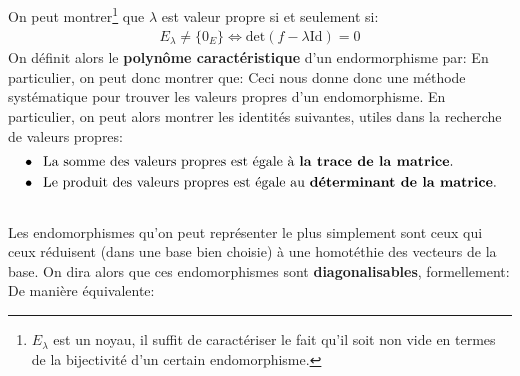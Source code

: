 \subsection*{}
On peut montrer\footnote[1]{\(E_\lambda\) est un noyau, il suffit de caractériser le fait qu'il soit non vide en termes de la bijectivité d'un certain endomorphisme.} que \(\lambda\) est valeur propre si et seulement si:
\begin{align*}
   E_\lambda \neq \bigl\{0_E\bigl\} \Longleftrightarrow \text{det}(f - \lambda \text{Id}) = 0
\end{align*}
On définit alors le \textbf{polynôme caractéristique} d'un endormorphisme par:
En particulier, on peut donc montrer que:
Ceci nous donne donc une méthode systématique pour trouver les valeurs propres d'un endomorphisme. En particulier, on peut alors montrer les identités suivantes, utiles dans la recherche de valeurs propres:
\begin{align*}
   &\bullet \;\; \text{La somme des valeurs propres est égale à \textbf{la trace de la matrice}.} \\
   &\bullet \;\; \text{Le produit des valeurs propres est égale au \textbf{déterminant de la matrice}.}
\end{align*}

\subsection*{}
Les endomorphismes qu'on peut représenter le plus simplement sont ceux qui ceux réduisent (dans une base bien choisie) à une homotéthie des vecteurs de la base. On dira alors que ces endomorphismes sont \textbf{diagonalisables}, formellement:
De manière équivalente:

